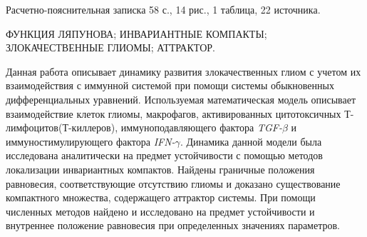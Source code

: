 \documentclass[14pt,a4paper]{extarticle}
\begin{document}
	\maketitle
	
	\begin{annotation}
	Расчетно-пояснительная записка 58 с., 14 рис., 1 таблица, 22  источника.
	
	\MakeUppercase{функция Ляпунова; инвариантные компакты; злокачественные глиомы; аттрактор.}
	
	Данная работа описывает динамику развития злокачественных глиом с учетом их взаимодействия с иммунной системой при помощи системы обыкновенных дифференциальных уравнений. Используемая математическая модель описывает взаимодействие клеток глиомы, макрофагов, активированных цитотоксичных Т-лимфоцитов(Т-киллеров), иммуноподавляющего фактора \textit{TGF-}$\beta$ и иммуностимулирующего фактора \textit{IFN-}$\gamma$. Динамика данной модели была исследована аналитически на предмет устойчивости с помощью методов локализации инвариантных компактов. Найдены граничные положения равновесия, соответствующие отсутствию глиомы и доказано существование компактного множества, содержащего аттрактор системы. При помощи численных методов найдено и исследовано на предмет устойчивости и внутреннее положение равновесия при определенных значениях параметров.
	\end{annotation}
	
	\tableofcontents
	
\end{document}
